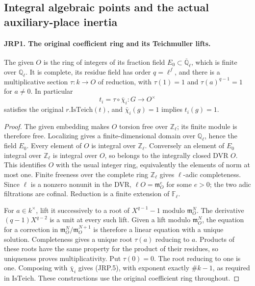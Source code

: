 \documentclass[11pt,a4paper]{article}
\numberwithin{equation}{section}
\theoremstyle{remark}\newtheorem{remark}[theorem]{Remark}
\begin{document}
\subsection{Integral algebraic points and the actual auxiliary-place inertia}

\paragraph{JRP1. The original coefficient ring and its Teichmuller lifts.}
\label{claim:JRP1}
The given \(O\) is the ring of integers of its fraction field
\(E_0\subset\overline{\mathbb Q}_\ell\), which is finite over
\(\mathbb Q_\ell\).  It is complete, its residue field has order
\(q=\ell^f\), and there is a multiplicative section
\(\tau:k\to O\) of reduction, with \(\tau(1)=1\) and
\(\tau(a)^{q-1}=1\) for \(a\ne0\).  In particular
\[
 t_i=\tau\circ\bar\chi_i:G\longrightarrow O^\times
 \tag{JRP.5}
\]
satisfies the original \(r.\mathrm{IsTeich}(t)\), and
\(\bar\chi_i(g)=1\) implies \(t_i(g)=1\).
\begin{proof}
The given embedding makes \(O\) torsion free over
\(\mathbb Z_\ell\); its finite module is therefore free.  Localizing
gives a finite-dimensional domain over \(\mathbb Q_\ell\), hence
the field \(E_0\).  Every element of \(O\) is integral over
\(\mathbb Z_\ell\).  Conversely an element of \(E_0\) integral
over \(\mathbb Z_\ell\) is integral over \(O\), so belongs to the
integrally closed DVR \(O\).  This identifies \(O\) with the
usual integer ring, equivalently the elements of norm at most one.
Finite freeness over the complete ring \(\mathbb Z_\ell\) gives
\(\ell\)-adic completeness.  Since \(\ell\) is a nonzero
nonunit in the DVR, \(\ell O=\mathfrak m_O^e\) for some
\(e>0\); the two adic filtrations are cofinal.  Reduction is a
finite extension of \(\mathbb F_\ell\).

For \(a\in k^\times\), lift it successively to a root of
\(X^{q-1}-1\) modulo \(\mathfrak m_O^N\).  The derivative
\((q-1)X^{q-2}\) is a unit at every such lift.  Given a lift
modulo \(\mathfrak m_O^N\), the equation for a correction in
\(\mathfrak m_O^N/\mathfrak m_O^{N+1}\) is therefore a linear
equation with a unique solution.  Completeness gives a unique root
\(\tau(a)\) reducing to \(a\).  Products of these roots have the
same property for the product of their residues, so uniqueness
proves multiplicativity.  Put \(\tau(0)=0\).  The root reducing
to one is one.  Composing with \(\bar\chi_i\) gives (JRP.5),
with exponent exactly \(\#k-1\), as required in
\(\mathrm{IsTeich}\).  These constructions use the original
coefficient ring throughout.
\end{proof}
\end{document}
